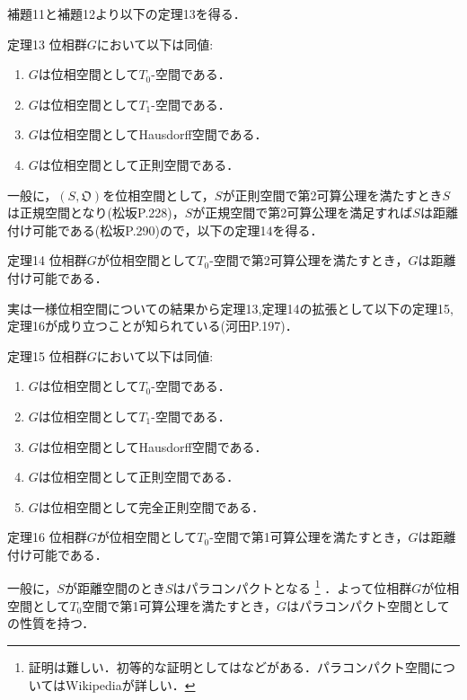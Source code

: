\documentclass[a4paper,11pt]{jsarticle}
\begin{document}
%
%
%
補題11と補題12より以下の定理13を得る．
\begin{itembox}[l]{定理13}
位相群$G$において以下は同値:
\vspace{-0.7zh}%
\begin{enumerate}
\renewcommand{\labelenumi}{(\arabic{enumi})}
\item $G$は位相空間として$T_0$-空間である．
\item $G$は位相空間として$T_1$-空間である．
\item $G$は位相空間としてHausdorff空間である．
\item $G$は位相空間として正則空間である．
\end{enumerate}
\end{itembox}
一般に，$(S,\mathfrak{O})$を位相空間として，$S$が正則空間で第2可算公理を満たすとき$S$は正規空間となり(松坂P.228)，$S$が正規空間で第2可算公理を満足すれば$S$は距離付け可能である(松坂P.290)ので，以下の定理14を得る．
\begin{itembox}[l]{定理14}
位相群$G$が位相空間として$T_0$-空間で第2可算公理を満たすとき，$G$は距離付け可能である．
\end{itembox}
%
%
%
実は一様位相空間についての結果から定理13,定理14の拡張として以下の定理15,定理16が成り立つことが知られている(河田P.197)．
\begin{itembox}[l]{定理15}
位相群$G$において以下は同値:
\vspace{-0.7zh}%
\begin{enumerate}
\renewcommand{\labelenumi}{(\arabic{enumi})}
\item $G$は位相空間として$T_0$-空間である．
\item $G$は位相空間として$T_1$-空間である．
\item $G$は位相空間としてHausdorff空間である．
\item $G$は位相空間として正則空間である．
\item $G$は位相空間として完全正則空間である．
\end{enumerate}
\end{itembox}
\begin{itembox}[l]{定理16}
位相群$G$が位相空間として$T_0$-空間で第1可算公理を満たすとき，$G$は距離付け可能である．
\end{itembox}
一般に，$S$が距離空間のとき$S$はパラコンパクトとなる
\footnote{証明は難しい．初等的な証明としては\cite{rudin}などがある．パラコンパクト空間についてはWikipediaが詳しい．}
．よって位相群$G$が位相空間として$T_0$空間で第1可算公理を満たすとき，$G$はパラコンパクト空間としての性質を持つ．
%
%
%
\end{document}
